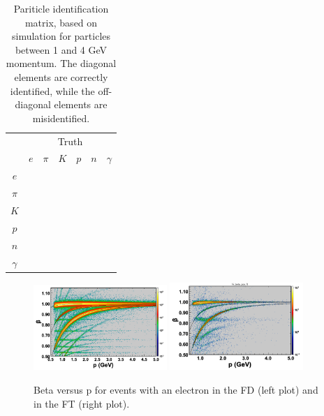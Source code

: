 \begin{table}[htpb]
  \begin{center}
    \label{tab:pidmatrix}
    \begin{tabular}{|c|cccccc|}\hline
          & \multicolumn{6}{|c|}{Truth}\\        
          & $e$ & $\pi$ & $K$ & $p$ & $n$ & $\gamma$ \\\hline
  $e$     &     &       &     &     &     &          \\ 
  $\pi$   &     &       &     &     &     &          \\ 
  $K$     &     &       &     &     &     &          \\ 
  $p$     &     &       &     &     &     &          \\ 
  $n$     &     &       &     &     &     &          \\ 
 $\gamma$ &     &       &     &     &     &          \\\hline 
    \end{tabular}
  \caption{Pariticle identification matrix, based on simulation for particles between 1 and 4 GeV momentum.  The diagonal elements are correctly identified, while the off-diagonal elements are misidentified.}
  \end{center}
\end{table}

\vspace{1in}
\begin{figure}
\includegraphics[width=0.45\textwidth]{pics/betavsp1.png}
\includegraphics[width=0.45\textwidth]{pics/betavsp2.png}
\caption{Beta versus p for events with an electron in the FD (left plot) and in the FT (right plot).
}
\label{fig:betavsp}
\end{figure}

